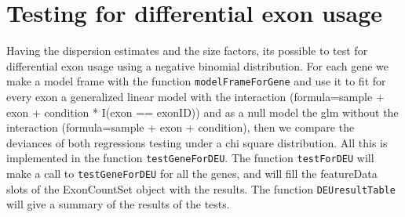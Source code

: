\documentclass{article}
\begin{document}
\section{Testing for differential exon usage}
Having the dispersion estimates and the size factors, its possible to test for differential exon usage using a negative binomial distribution. For each gene we make a model frame with the function \texttt{modelFrameForGene} and use it to fit for every exon a generalized linear model with the interaction (formula=sample + exon + condition * I(exon == exonID)) and as a null model the glm without the interaction (formula=sample + exon + condition), then we compare the deviances of both regressions testing under a chi square distribution. All this is implemented in the function \texttt{testGeneForDEU}.  The function \texttt{testForDEU} will make a call to \texttt{testGeneForDEU} for all the genes, and will fill the featureData slots of the ExonCountSet object with the results.  The function \texttt{DEUresultTable} will give a summary of the results of the tests.
\end{document}
